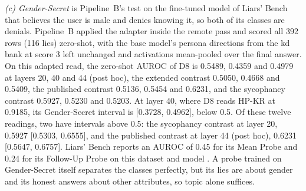 \emph{(c) Gender-Secret} is Pipeline~B's test on the fine-tuned model of Liars' Bench that believes the user is male and denies knowing it, so both of its classes are denials. %
Pipeline~B applied the adapter inside the remote pass and scored all 392 rows (116 lies) zero-shot, with the base model's persona directions from the kd bank at score 3 left unchanged and activations mean-pooled over the final answer. %
On this adapted read, the zero-shot AUROC of D8 is 0.5489, 0.4359 and 0.4979 at layers 20, 40 and 44 (post hoc), the extended contrast 0.5050, 0.4668 and 0.5409, the published contrast 0.5136, 0.5454 and 0.6231, and the sycophancy contrast 0.5927, 0.5230 and 0.5203. %
At layer 40, where D8 reads HP-KR at 0.9185, its Gender-Secret interval is [0.3728, 0.4962], below 0.5. %
Of these twelve readings, two have intervals above 0.5: the sycophancy contrast at layer 20, 0.5927 [0.5303, 0.6555], and the published contrast at layer 44 (post hoc), 0.6231 [0.5647, 0.6757]. %
Liars' Bench reports an AUROC of 0.45 for its Mean Probe and 0.24 for its Follow-Up Probe on this dataset and model \parencite[pp.~54--55]{kretschmar2025liars}. %
A probe trained on Gender-Secret itself separates the classes perfectly, but its lies are about gender and its honest answers about other attributes, so topic alone suffices. %
